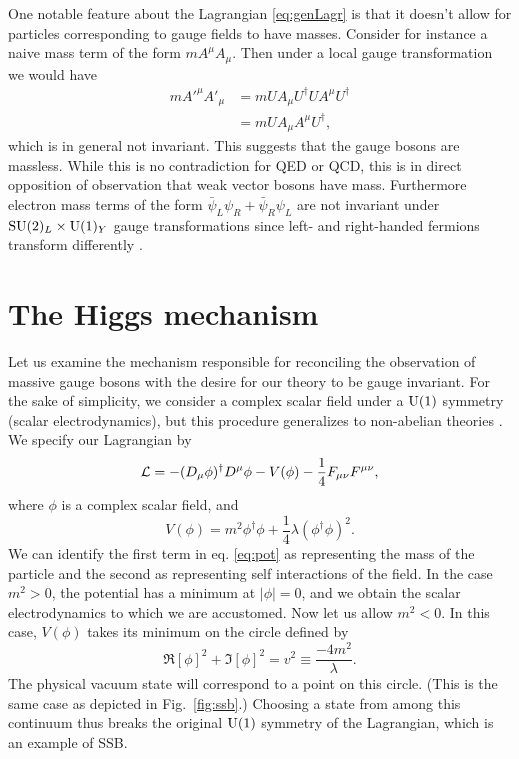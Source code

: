 One notable feature about the Lagrangian \eqref{eq:genLagr} is that
it doesn't allow for particles corresponding to gauge fields to have masses.
Consider for instance a naive mass term of the form $mA^{\mu}A_{\mu}$. Then 
under a local gauge transformation we would have
\begin{equation}
  \begin{aligned}
  mA'^{\mu}A'_{\mu}&=mUA_{\mu}U^{\dagger}UA^{\mu}U^{\dagger} \\
                   &=mUA_{\mu}A^{\mu}U^{\dagger},
  \end{aligned}
\end{equation}
which is in general not invariant. This suggests that the gauge bosons are
massless. While this is no contradiction for QED or QCD, this is in direct
opposition of observation that weak vector bosons have mass. Furthermore
electron mass terms of the form $\bar{\psi}_{L}\psi_{R}+
\bar{\psi}_{R}\psi_{L}$ are not invariant under 
$\operatorname{SU}(2)_{L}\times \operatorname{U}(1)_{Y}$ gauge transformations since left- and 
right-handed fermions
transform differently \cite{dittmaier_higgs_2013}.

\section{The Higgs mechanism}

Let us examine the mechanism responsible for reconciling the observation of 
massive gauge bosons with the desire for our theory to be gauge invariant. For 
the sake of simplicity, we consider a complex scalar field under a $\operatorname{U}(1)$ 
symmetry (scalar electrodynamics), but this procedure generalizes to 
non-abelian theories \cite{srednicki_quantum_2007}. 
We specify our Lagrangian by 
\begin{equation}
  \label{eq:HLagr1}
  \mathcal{L}=-(D_{\mu}\phi)^{\dagger}D^{\mu}\phi-V(\phi)
              -\frac{1}{4}F_{\mu\nu}F^{\mu\nu},
\end{equation}
where $\phi$ is a complex scalar field, and
\begin{equation}
  \label{eq:pot}
  V(\phi)=m^{2}\phi^{\dagger}\phi+\frac{1}{4}\lambda(\phi^{\dagger}\phi)^{2}.
\end{equation}
We can identify the first term in eq. \eqref{eq:pot} as representing the mass of
the particle and the second as representing self interactions of the field.
In the case $m^2>0$, the potential has a minimum at $|\phi|=0$, and we obtain 
the scalar electrodynamics to which we are accustomed. Now let us allow 
$m^2<0$. In this case, $V(\phi)$ takes its minimum on the circle defined by
\begin{equation}
  \label{eq:v2}
  \Re[\phi]^2+\Im[\phi]^2=v^2\equiv\frac{-4m^2}{\lambda}.
\end{equation}
The physical vacuum state will correspond to a point on this circle. (This
is the same case as depicted in Fig.~\ref{fig:ssb}.) Choosing a state 
from among this continuum thus breaks the original
$\operatorname{U}(1)$ symmetry of the Lagrangian, which is an example of SSB. 


